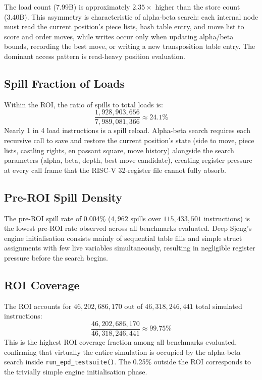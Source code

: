 \documentclass[conference]{IEEEtran}
\begin{document}
The load count (7.99B) is approximately $2.35\times$ higher than the
store count (3.40B). This asymmetry is characteristic of alpha-beta
search: each internal node must read the current position's piece
lists, hash table entry, and move list to score and order moves, while
writes occur only when updating alpha/beta bounds, recording the best
move, or writing a new transposition table entry. The dominant access
pattern is read-heavy position evaluation.

\subsection{Spill Fraction of Loads}

Within the ROI, the ratio of spills to total loads is:
\[
\frac{1{,}928{,}903{,}656}{7{,}989{,}081{,}366} \approx 24.1\%
\]
Nearly 1 in 4 load instructions is a spill reload. Alpha-beta search
requires each recursive call to save and restore the current position's
state (side to move, piece lists, castling rights, en passant square,
move history) alongside the search parameters (alpha, beta, depth,
best-move candidate), creating register pressure at every call frame
that the RISC-V 32-register file cannot fully absorb.

\subsection{Pre-ROI Spill Density}

The pre-ROI spill rate of 0.004\% ($4{,}962$ spills over
$115{,}433{,}501$ instructions) is the lowest pre-ROI rate observed
across all benchmarks evaluated. Deep Sjeng's engine initialisation
consists mainly of sequential table fills and simple struct
assignments with few live variables simultaneously, resulting in
negligible register pressure before the search begins.

\subsection{ROI Coverage}

The ROI accounts for $46{,}202{,}686{,}170$ out of $46{,}318{,}246{,}441$
total simulated instructions:
\[
\frac{46{,}202{,}686{,}170}{46{,}318{,}246{,}441} \approx 99.75\%
\]
This is the highest ROI coverage fraction among all benchmarks evaluated,
confirming that virtually the entire simulation is occupied by the
alpha-beta search inside \texttt{run\_epd\_testsuite()}. The 0.25\%
outside the ROI corresponds to the trivially simple engine initialisation
phase.
\end{document}
